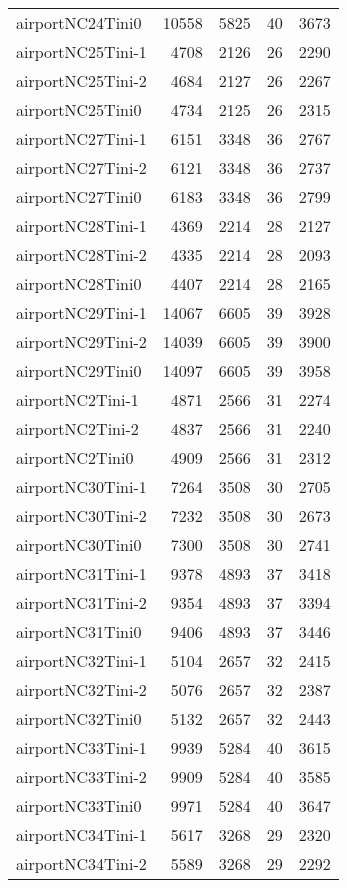 \begin{longtable}{lrrrr}
airportNC24Tini0 & 10558 & 5825 & 40 & 3673 \\
airportNC25Tini-1 & 4708 & 2126 & 26 & 2290 \\
airportNC25Tini-2 & 4684 & 2127 & 26 & 2267 \\
airportNC25Tini0 & 4734 & 2125 & 26 & 2315 \\
airportNC27Tini-1 & 6151 & 3348 & 36 & 2767 \\
airportNC27Tini-2 & 6121 & 3348 & 36 & 2737 \\
airportNC27Tini0 & 6183 & 3348 & 36 & 2799 \\
airportNC28Tini-1 & 4369 & 2214 & 28 & 2127 \\
airportNC28Tini-2 & 4335 & 2214 & 28 & 2093 \\
airportNC28Tini0 & 4407 & 2214 & 28 & 2165 \\
airportNC29Tini-1 & 14067 & 6605 & 39 & 3928 \\
airportNC29Tini-2 & 14039 & 6605 & 39 & 3900 \\
airportNC29Tini0 & 14097 & 6605 & 39 & 3958 \\
airportNC2Tini-1 & 4871 & 2566 & 31 & 2274 \\
airportNC2Tini-2 & 4837 & 2566 & 31 & 2240 \\
airportNC2Tini0 & 4909 & 2566 & 31 & 2312 \\
airportNC30Tini-1 & 7264 & 3508 & 30 & 2705 \\
airportNC30Tini-2 & 7232 & 3508 & 30 & 2673 \\
airportNC30Tini0 & 7300 & 3508 & 30 & 2741 \\
airportNC31Tini-1 & 9378 & 4893 & 37 & 3418 \\
airportNC31Tini-2 & 9354 & 4893 & 37 & 3394 \\
airportNC31Tini0 & 9406 & 4893 & 37 & 3446 \\
airportNC32Tini-1 & 5104 & 2657 & 32 & 2415 \\
airportNC32Tini-2 & 5076 & 2657 & 32 & 2387 \\
airportNC32Tini0 & 5132 & 2657 & 32 & 2443 \\
airportNC33Tini-1 & 9939 & 5284 & 40 & 3615 \\
airportNC33Tini-2 & 9909 & 5284 & 40 & 3585 \\
airportNC33Tini0 & 9971 & 5284 & 40 & 3647 \\
airportNC34Tini-1 & 5617 & 3268 & 29 & 2320 \\
airportNC34Tini-2 & 5589 & 3268 & 29 & 2292 \\

\end{longtable}
